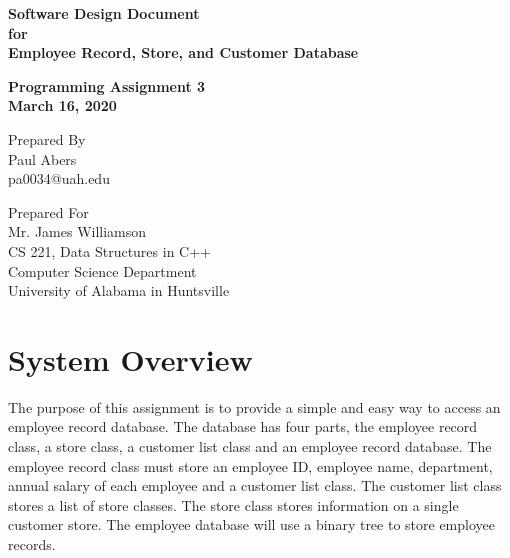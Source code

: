 \documentclass[12pt]{article}%
\begin{document}
\begin{titlepage}
    \clearpage\thispagestyle{empty}
    \centering
    \vspace{2cm}

    {\Huge \textbf{Software Design Document \\
        for \\
        Employee Record, Store, and Customer Database}} \\
    \vspace{1cm}
    {\large \textbf{Programming Assignment 3 \\
      March 16, 2020} \par}
    \vspace{4cm}
    {\normalsize Prepared By \\ %
      Paul Abers \\
      pa0034@uah.edu \par}
    \vspace{2cm}

    \vspace{2cm}

    {\normalsize Prepared For \\
        Mr. James Williamson \\
        CS 221, Data Structures in C++ \\
        Computer Science Department \\
        University of Alabama in Huntsville \par}

      \vspace{2cm}

	\pagebreak

\end{titlepage}

\tableofcontents

\section{System Overview}
The purpose of this assignment is to provide a simple and easy way
to access an employee record database. The database has four parts,
the employee record class, a store class, a customer list class and
an employee record database.
The employee record class must store an employee ID,
employee name, department, annual salary of each employee and a customer
list class. The customer list class stores a list of store classes. The store
class stores information on a single customer store. The employee database will
use a binary tree to store employee records.
\end{document}
